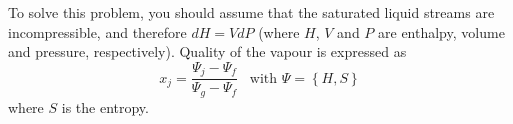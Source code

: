 \documentclass[calculator,steamtables,allquestions,datasheet,resit,solutions]{exam_newMarcus2}
\newcommand{\frc}{\displaystyle\frac}
\begin{document}
\begin{question}
\begin{enumerate}[(a)]
\end{enumerate}
To solve this problem, you should assume that the saturated liquid streams are incompressible, and therefore $dH = VdP$ (where $H$, $V$ and $P$ are enthalpy, volume and pressure, respectively). Quality of the vapour is expressed as
\begin{displaymath}
x_{j} = \frc{\Psi_{j}-\Psi_{f}}{\Psi_{g}-\Psi_{f}}\;\;\;\text{with }\Psi=\left\{H,S\right\}
\end{displaymath}
where $S$ is the entropy. 

\end{question}
\clearpage
\end{document}
